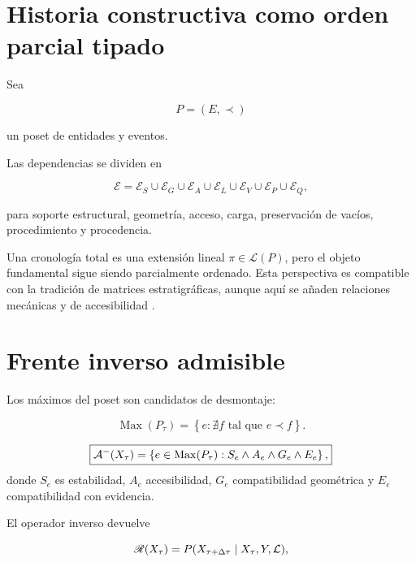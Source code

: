 
\section{Historia constructiva como orden parcial tipado}

Sea

\begin{equation}
P=(E,\prec)
\end{equation}

un poset de entidades y eventos.

Las dependencias se dividen en

\begin{equation}
\mathcal E
=
\mathcal E_S
\cup
\mathcal E_G
\cup
\mathcal E_A
\cup
\mathcal E_L
\cup
\mathcal E_V
\cup
\mathcal E_P
\cup
\mathcal E_Q,
\end{equation}

para soporte estructural, geometría, acceso, carga, preservación de vacíos, procedimiento y procedencia.

Una cronología total es una extensión lineal \(\pi\in\mathcal L(P)\), pero el objeto fundamental sigue siendo parcialmente ordenado. Esta perspectiva es compatible con la tradición de matrices estratigráficas, aunque aquí se añaden relaciones mecánicas y de accesibilidad \cite{harris1989}.

\section{Frente inverso admisible}

Los máximos del poset son candidatos de desmontaje:

\begin{equation}
\operatorname{Max}(P_\tau)
=
\left\{
e:
\nexists f\text{ tal que }e\prec f
\right\}.
\end{equation}

\begin{definition}
\begin{equation}
\boxed{
\mathcal A^{-}(X_\tau)
=
\left\{
e\in\operatorname{Max}(P_\tau):
S_e\land A_e\land G_e\land E_e
\right\},
}
\end{equation}
donde \(S_e\) es estabilidad, \(A_e\) accesibilidad, \(G_e\) compatibilidad geométrica y \(E_e\) compatibilidad con evidencia.
\end{definition}

El operador inverso devuelve

\begin{equation}
\mathscr R(X_\tau)
=
P(X_{\tau+\Delta\tau}\mid X_\tau,Y,\mathcal L),
\end{equation}


